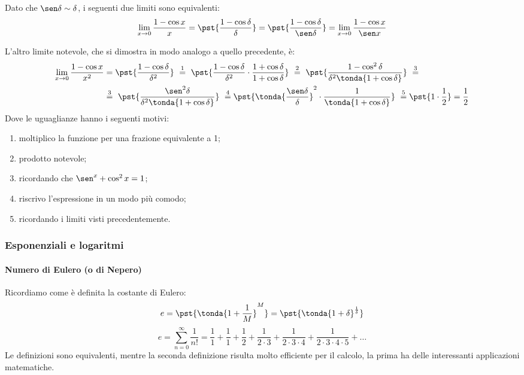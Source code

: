 \begin{osservazione}
Dato che \(\sen \delta \sim \delta\), i seguenti due limiti sono 
equivalenti:
\[\lim_{x \rightarrow 0} \frac{1-\cos x}{x} =
 \pst{\frac{1-\cos \delta}{\delta}} =
 \pst{\frac{1-\cos \delta}{\sen \delta}} =
 \lim_{x \rightarrow 0} \frac{1-\cos x}{\sen x}\]
\end{osservazione}

L'altro limite notevole, che si dimostra in modo analogo a quello 
precedente, è:
\begin{align*}
 \lim_{x \rightarrow 0} \frac{1-\cos x}{x^2} &=
 \pst{\frac{1-\cos \delta}{\delta^2}}
~ \stackrel{1}{=} ~  
 \pst{\frac{1-\cos \delta}{\delta^2} \cdot 
      \frac{1+\cos \delta}{1+\cos \delta}}
~ \stackrel{2}{=} ~ 
 \pst{\frac{1-\cos^2 \delta}{\delta^2 \tonda{1+\cos \delta}}}~ 
\stackrel{3}{=} \\
& \stackrel{3}{=} ~
 \pst{\frac{\sen^2 \delta}{\delta^2 \tonda{1+\cos \delta}}}
~ \stackrel{4}{=}
 \pst{\tonda{\frac{\sen \delta}{\delta}}^2 \cdot 
      \frac{1}{\tonda{1+\cos \delta}}}
~ \stackrel{5}{=}
 \pst{1 \cdot \frac{1}{2}} = \frac{1}{2}
\end{align*}
Dove le uguaglianze hanno i seguenti motivi:
\begin{enumerate} [nosep]
 \item moltiplico la funzione per una frazione equivalente a 1;
 \item prodotto notevole;
 \item ricordando che \(\sen^x + \cos^2 x = 1\);
 \item riscrivo l'espressione in un modo più comodo;
 \item ricordando i limiti visti precedentemente.
\end{enumerate}

\subsubsection{Esponenziali e logaritmi}

\paragraph{Numero di Eulero (o di Nepero)}

Ricordiamo come è definita la costante di Eulero:
\[e = \pst{\tonda{1+\frac{1}{M}}^M} = 
\pst{\tonda{1+\delta}^\frac{1}{\delta}} 
\]
\[e=\sum_{n=0}^{\infty}{\frac{1}{n!}}=
\frac{1}{1}+\frac{1}{1}+\frac{1}{2}+\frac{1}{2\cdot3}+
\frac{1}{2\cdot3\cdot4}+\frac{1}{2\cdot3\cdot4\cdot5}+\dots\]
Le definizioni sono equivalenti, mentre la seconda definizione risulta 
molto efficiente per il calcolo, la 
prima ha delle interessanti applicazioni matematiche.


